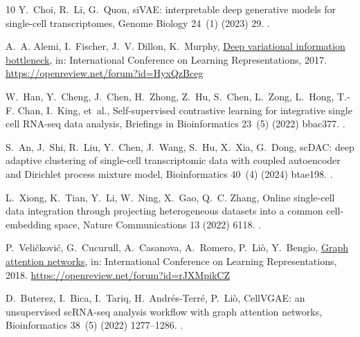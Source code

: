 \documentclass[preprint,12pt]{elsarticle}
\begin{document}
\begin{thebibliography}{10}
Y.~Choi, R.~Li, G.~Quon, si{VAE}: interpretable deep generative models for
  single-cell transcriptomes, Genome Biology 24~(1) (2023) 29.
\newblock \href {https://doi.org/10.1186/s13059-023-02850-y}
  {}.

A.~A. Alemi, I.~Fischer, J.~V. Dillon, K.~Murphy,
  \href{https://openreview.net/forum?id=HyxQzBceg}{Deep variational information
  bottleneck}, in: International Conference on Learning Representations, 2017.
\newline\urlprefix\url{https://openreview.net/forum?id=HyxQzBceg}

W.~Han, Y.~Cheng, J.~Chen, H.~Zhong, Z.~Hu, S.~Chen, L.~Zong, L.~Hong, T.-F.
  Chan, I.~King, et~al., Self-supervised contrastive learning for integrative
  single cell {RNA-seq} data analysis, Briefings in Bioinformatics 23~(5)
  (2022) bbac377.
\newblock \href {https://doi.org/10.1093/bib/bbac377}
  {}.

S.~An, J.~Shi, R.~Liu, Y.~Chen, J.~Wang, S.~Hu, X.~Xia, G.~Dong, sc{DAC}: deep
  adaptive clustering of single-cell transcriptomic data with coupled
  autoencoder and {Dirichlet} process mixture model, Bioinformatics 40~(4)
  (2024) btae198.
\newblock \href {https://doi.org/10.1093/bioinformatics/btae198}
  {}.

L.~Xiong, K.~Tian, Y.~Li, W.~Ning, X.~Gao, Q.~C. Zhang, Online single-cell data
  integration through projecting heterogeneous datasets into a common
  cell-embedding space, Nature Communications 13 (2022) 6118.
\newblock \href {https://doi.org/10.1038/s41467-022-33758-z}
  {}.

P.~Veli{\v{c}}kovi{\'c}, G.~Cucurull, A.~Casanova, A.~Romero, P.~Li{\`o},
  Y.~Bengio, \href{https://openreview.net/forum?id=rJXMpikCZ}{Graph attention
  networks}, in: International Conference on Learning Representations, 2018.
\newline\urlprefix\url{https://openreview.net/forum?id=rJXMpikCZ}

D.~Buterez, I.~Bica, I.~Tariq, H.~Andr{\'e}s-Terr{\'e}, P.~Li{\`o}, {CellVGAE}:
  an unsupervised {scRNA-seq} analysis workflow with graph attention networks,
  Bioinformatics 38~(5) (2022) 1277--1286.
\newblock \href {https://doi.org/10.1093/bioinformatics/btab804}
  {}.


\end{thebibliography}
\end{document}

